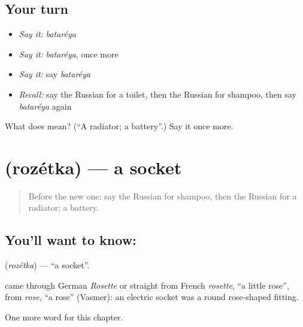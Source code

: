 \subsection*{Your turn}
\begin{itemize}
\raggedright
  \item \emph{Say it:} \emph{bataréya}
  \item \emph{Say it:} \emph{bataréya}, once more
  \item \emph{Say it:} say \emph{bataréya}
  \item \emph{Recall:} say the Russian for a toilet, then the Russian for shampoo, then say \emph{bataréya} again
\end{itemize}

\begin{tcolorbox}[breakable,colback=teal!4,colframe=teal!35!black,title={Before you move on}]
What does  mean? (\textquotedblleft{}A radiator; a battery\textquotedblright{}.) Say it once more.
\end{tcolorbox}
\section[\texorpdfstring{\ru{розетка} (rozétka)}{розетка (rozétka)}]{ (rozétka) — a socket}

\label{lesson:RU-C191-rozetka}



\begin{quote}
Before the new one: say the Russian for shampoo, then the Russian for a radiator; a battery.
\end{quote}

\subsection*{You'll want to know: }
\textbf{} (\emph{rozétka}) — \textquotedblleft{}a socket\textquotedblright{}.

\begin{cousinweb}
\textbf{} came through German \emph{Rosette} or straight from French \emph{rosette}, \textquotedblleft{}a little rose\textquotedblright{}, from \emph{rose}, \textquotedblleft{}a rose\textquotedblright{} (Vasmer): an electric socket was a round rose-shaped fitting.
\end{cousinweb}

\begin{grammarlens}[title={What you've built}]
One more word for this chapter.
\end{grammarlens}

